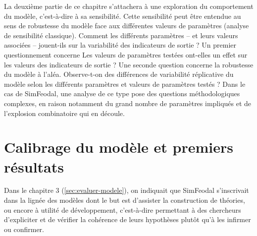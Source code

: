 La deuxième partie de ce chapitre s'attachera à une exploration du comportement du modèle, c'est-à-dire à sa sensibilité.
Cette sensibilité peut être entendue au sens de robustesse du modèle face aux différentes valeurs de paramètres (analyse de sensibilité classique).
Comment les différents paramètres -- et leurs valeurs associées -- jouent-ils sur la variabilité des indicateurs de sortie ?
Un premier questionnement concerne
Les valeurs de paramètres testées ont-elles un effet sur les valeurs des indicateurs de sortie ?
Une seconde question concerne la robustesse du modèle à l'aléa.
Observe-t-on des différences de variabilité réplicative du modèle selon les différents paramètres et valeurs de paramètres testés ?
Dans le cas de SimFeodal, une analyse de ce type pose des questions méthodologiques complexes, en raison notamment du grand nombre de paramètres impliqués et de \og l'explosion combinatoire\fg{} qui en découle.


\clearpage
\section{Calibrage du modèle et premiers résultats}

Dans le chapitre 3 (\cref{sec:evaluer-modele}), on indiquait que SimFeodal s'inscrivait dans la lignée des  modèles dont le but est d'\og assister la construction de théories\fg{}, ou encore \og à utilité de développement\fg{}, c'est-à-dire permettant à des chercheurs d'expliciter et de vérifier la cohérence de leurs hypothèses plutôt qu'à les infirmer ou confirmer.

